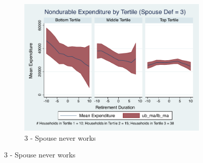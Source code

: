 \documentclass[11pt,onecolumn]{article}
\numberwithin{figure}{section}
\begin{document}
\begin{figure}
\begin{subfigure}{1.0\textwidth}
	\caption{3 - Spouse never works}
	\centering
	\includegraphics[width=0.8\linewidth]{../ConsumptionPostRetirement_by_SpouseDef/Smoothed/spouse_def_3.pdf}
	\end{subfigure}
	\vspace{1cm}
	

\end{figure}
\end{document}
